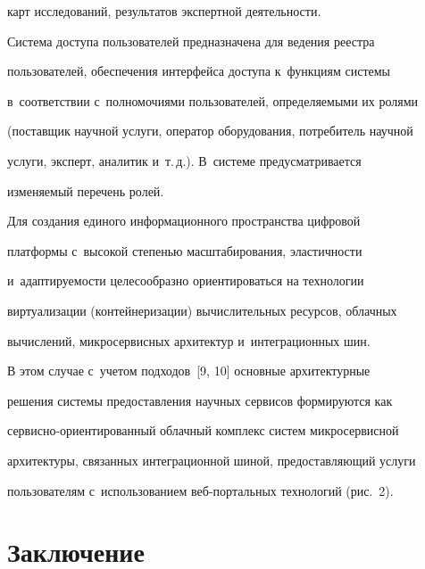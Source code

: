 карт исследований, результатов экспертной деятельности.


     


     Система доступа пользователей предназначена для ведения реестра 


пользователей, обеспечения интерфейса доступа к~функциям системы 


в~соответствии с~полномочиями пользователей, определяемыми их ролями 


(поставщик научной услуги, оператор оборудования, потребитель научной 


услуги, эксперт, аналитик и~т.\,д.). В~системе предусматривается 


изменяемый перечень ролей.


     


     Для создания единого информационного пространства цифровой 


платформы с~высокой степенью масштабирования, эластичности 


и~адаптируемости целесообразно ориентироваться на технологии 


виртуализации (контейнеризации) вычислительных ресурсов, облачных 


вычислений, микросервисных архитектур и~интеграционных шин.


     


     В этом случае с~учетом подходов~[9, 10] основные архитектурные 


решения системы предоставления научных сервисов формируются как 


сер\-вис\-но-ори\-ен\-ти\-ро\-ван\-ный облачный комплекс систем микросервисной 


архитектуры, связан\-ных интеграционной шиной, предоставляющий услуги 


пользователям с~использованием веб-портальных технологий (рис.~2).


     








\section{Заключение}





